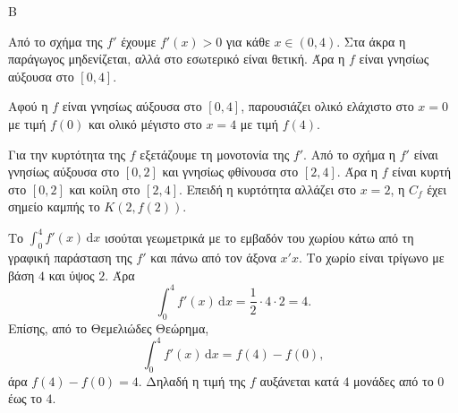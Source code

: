 
\begin{thema}{Β}
\begin{erwthma}
\item Από το σχήμα της $f'$ έχουμε $f'(x)>0$ για κάθε $x\in(0,4)$. Στα άκρα η παράγωγος μηδενίζεται, αλλά στο εσωτερικό είναι θετική. Άρα η $f$ είναι γνησίως αύξουσα στο $[0,4]$.

\item Αφού η $f$ είναι γνησίως αύξουσα στο $[0,4]$, παρουσιάζει ολικό ελάχιστο στο $x=0$ με τιμή $f(0)$ και ολικό μέγιστο στο $x=4$ με τιμή $f(4)$.

\item Για την κυρτότητα της $f$ εξετάζουμε τη μονοτονία της $f'$. Από το σχήμα η $f'$ είναι γνησίως αύξουσα στο $[0,2]$ και γνησίως φθίνουσα στο $[2,4]$. Άρα η $f$ είναι κυρτή στο $[0,2]$ και κοίλη στο $[2,4]$. Επειδή η κυρτότητα αλλάζει στο $x=2$, η $C_f$ έχει σημείο καμπής το $K(2,f(2))$.

\item Το $\int_0^4 f'(x)\,\mathrm{d}x$ ισούται γεωμετρικά με το εμβαδόν του χωρίου κάτω από τη γραφική παράσταση της $f'$ και πάνω από τον άξονα $x'x$. Το χωρίο είναι τρίγωνο με βάση $4$ και ύψος $2$. Άρα
\[
\int_0^4 f'(x)\,\mathrm{d}x=\frac12\cdot4\cdot2=4.
\]
Επίσης, από το Θεμελιώδες Θεώρημα,
\[
\int_0^4 f'(x)\,\mathrm{d}x=f(4)-f(0),
\]
άρα $f(4)-f(0)=4$. Δηλαδή η τιμή της $f$ αυξάνεται κατά $4$ μονάδες από το $0$ έως το $4$.
\end{erwthma}
\end{thema}


